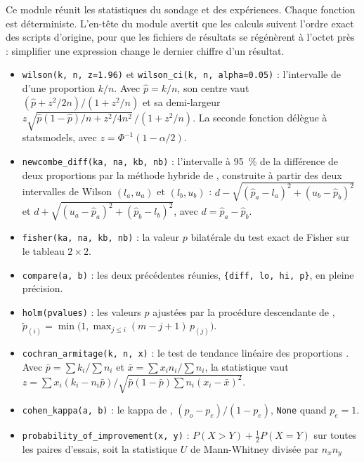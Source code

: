 Ce module réunit les statistiques du sondage et des expériences. Chaque fonction est déterministe.
L'en-tête du module avertit que les calculs suivent l'ordre exact des scripts d'origine, pour que
les fichiers de résultats se régénèrent à l'octet près : simplifier une expression change le
dernier chiffre d'un résultat.
\begin{itemize}
  \item \texttt{wilson(k, n, z=1.96)} et \texttt{wilson\_ci(k, n, alpha=0.05)} : l'intervalle de
        \textcite{wilson1927probable} d'une proportion $k/n$. Avec $\hat p = k/n$, son centre vaut
        $(\hat p + z^2/2n)/(1 + z^2/n)$ et sa demi-largeur
        $z\sqrt{\hat p(1-\hat p)/n + z^2/4n^2}\,/(1 + z^2/n)$. La seconde fonction délègue à
        statsmodels, avec $z = \Phi^{-1}(1-\alpha/2)$.
  \item \texttt{newcombe\_diff(ka, na, kb, nb)} : l'intervalle à 95~\% de la différence de deux
        proportions par la méthode hybride de \textcite{newcombe1998interval}, construite à partir
        des deux intervalles de Wilson $(l_a, u_a)$ et $(l_b, u_b)$ :
        $d - \sqrt{(\hat p_a - l_a)^2 + (u_b - \hat p_b)^2}$ et
        $d + \sqrt{(u_a - \hat p_a)^2 + (\hat p_b - l_b)^2}$, avec $d = \hat p_a - \hat p_b$.
  \item \texttt{fisher(ka, na, kb, nb)} : la valeur $p$ bilatérale du test exact de Fisher sur le
        tableau $2 \times 2$.
  \item \texttt{compare(a, b)} : les deux précédentes réunies, \texttt{\{diff, lo, hi, p\}}, en
        pleine précision.
  \item \texttt{holm(pvalues)} : les valeurs $p$ ajustées par la procédure descendante de
        \textcite{holm1979simple}, $\tilde p_{(i)} = \min\bigl(1, \max_{j \le i}(m-j+1)\,p_{(j)}\bigr)$.
  \item \texttt{cochran\_armitage(k, n, x)} : le test de tendance linéaire des proportions
        \parencite{armitage1955tests}. Avec $\bar p = \sum k_i / \sum n_i$ et
        $\bar x = \sum x_i n_i / \sum n_i$, la statistique vaut
        $z = \sum x_i (k_i - n_i \bar p) \big/ \sqrt{\bar p(1-\bar p)\sum n_i (x_i - \bar x)^2}$.
  \item \texttt{cohen\_kappa(a, b)} : le kappa de \textcite{cohen1960coefficient},
        $(p_o - p_e)/(1 - p_e)$, \texttt{None} quand $p_e = 1$.
  \item \texttt{probability\_of\_improvement(x, y)} : $P(X > Y) + \tfrac12 P(X = Y)$ sur toutes les
        paires d'essais, soit la statistique $U$ de Mann-Whitney divisée par $n_x n_y$

\end{itemize}

